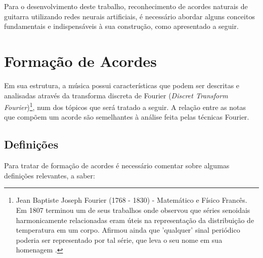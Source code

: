 
\localtableofcontents*


Para o desenvolvimento deste trabalho, reconhecimento de acordes naturais de guitarra utilizando redes neurais artificiais, é necessário abordar alguns conceitos fundamentais e indispensáveis à sua construção, como apresentado a seguir.

\section{Formação de Acordes}

Em sua estrutura, a música possui características que podem ser descritas e analisadas através da transforma discreta de Fourier (\textit{Discret Transform Fourier})\footnote{Jean Baptiste Joseph Fourier (1768 - 1830) - Matemático e Físico Francês. Em 1807 terminou um de seus trabalhos onde observou que séries senoidais harmonicamente relacionadas eram úteis na representação da distribuição de temperatura em um corpo. Afirmou ainda que 'qualquer' sinal periódico poderia ser representado por tal série, que leva o seu nome em sua homenagem \cite{oppen2010}.}, num dos tópicos que será tratado a seguir. A relação entre as notas que compõem um acorde são semelhantes à análise feita pelas técnicas Fourier.



\subsection{Definições}

Para tratar de formação de acordes é necessário comentar sobre algumas definições relevantes, a saber:

